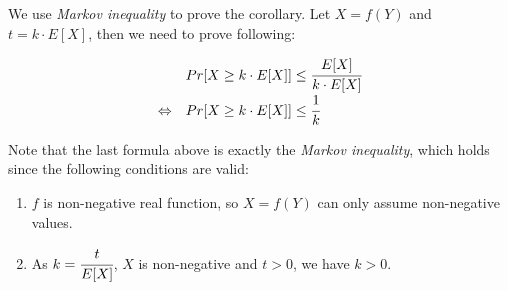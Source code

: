 We use \textit{Markov inequality} to prove the corollary. Let $X = f(Y)$ and $t = k \cdot E[X]$, then we need to prove following:

\[
\def\arraystretch{1.5}
\begin{array}{l l}
                & Pr[X \geq k \cdot E[X]] \leq \cfrac{E[X]}{k \cdot E[X]} \\
\Leftrightarrow & Pr[X \geq k \cdot E[X]] \leq \cfrac{1}{k}
\end{array}
\]

\noindent
Note that the last formula above is exactly the \textit{Markov inequality}, which holds since the following conditions are valid:

\begin{enumerate}
  \item $f$ is non-negative real function, so $X = f(Y)$ can only assume non-negative values.
  \item As $k = \cfrac{t}{E[X]}$, $X$ is non-negative and $t > 0$, we have $k > 0$.
\end{enumerate}
